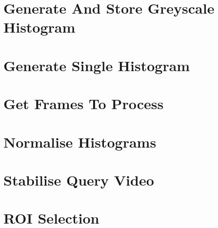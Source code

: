 \section{Generate And Store Greyscale Histogram}
\label{sec:code-generate-and-store-greyscale-histogram}




\section{Generate Single Histogram}
\label{sec:code-generate-single-histogram}




\section{Get Frames To Process}
\label{sec:code-listings-get-frames-to-process}





\section{Normalise Histograms}




\section{Stabilise Query Video}
\label{sec:code-stabilise-query-video}




\section{ROI Selection}
\label{sec:code-roi-selection}


